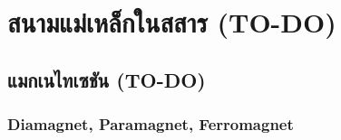 \chapter{สนามแม่เหล็กในสสาร (TO-DO)}
\section{แมกเนไทเซชัน (TO-DO)}
\subsection{Diamagnet, Paramagnet, Ferromagnet}